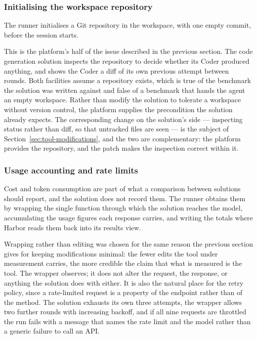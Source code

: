 \subsubsection{Initialising the workspace repository}

The runner initialises a Git repository in the workspace, with one empty
commit, before the session starts.

This is the platform's half of the issue described in the previous section. The
code generation solution inspects the repository to decide whether its Coder
produced anything, and shows the Coder a diff of its own previous attempt
between rounds. Both facilities assume a repository exists, which is true of
the benchmark the solution was written against and false of a benchmark that
hands the agent an empty workspace. Rather than modify the solution to tolerate
a workspace without version control, the platform supplies the precondition the
solution already expects. The corresponding change on the solution's side ---
inspecting status rather than diff, so that untracked files are seen --- is the
subject of Section~\ref{sec:tool-modifications}, and the two are
complementary: the platform provides the repository, and the patch makes the
inspection correct within it.


\subsubsection{Usage accounting and rate limits}

Cost and token consumption are part of what a comparison between solutions
should report, and the solution does not record them. The runner obtains them
by wrapping the single function through which the solution reaches the model,
accumulating the usage figures each response carries, and writing the totals
where Harbor reads them back into its results view.

Wrapping rather than editing was chosen for the same reason the previous
section gives for keeping modifications minimal: the fewer edits the tool under
measurement carries, the more credible the claim that what is measured is the
tool. The wrapper observes; it does not alter the request, the response, or
anything the solution does with either. It is also the natural place for the
retry policy, since a rate-limited request is a property of the endpoint rather
than of the method. The solution exhausts its own three attempts, the wrapper
allows two further rounds with increasing backoff, and if all nine requests are
throttled the run fails with a message that names the rate limit and the model
rather than a generic failure to call an API.


